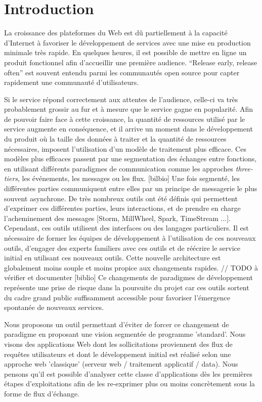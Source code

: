 \section{Introduction}

La croissance des plateformes du Web est dû partiellement à la capacité
d'Internet à favoriser le développement de services avec une mise en production minimale très rapide.
En quelques heures, il est possible de mettre en ligne un produit fonctionnel afin d'accueillir une première audience.
``Release early, release often'' est souvent entendu parmi les communautés open source pour capter rapidement une communauté d'utilisateurs.

Si le service répond correctement aux attentes de l'audience, celle-ci va très probablement grossir au fur et à mesure que le service gagne en popularité.
Afin de pouvoir faire face à cette croissance, la quantité de ressources utilisé par le service augmente en conséquence, et il arrive un moment dans le développement du produit où la taille des données à traiter et la quantité de ressources nécessaires, imposent l'utilisation d'un modèle de traitement plus efficace.
Ces modèles plus efficaces passent par une segmentation des échanges entre
fonctions, en utilisant différents paradigmes de communication comme les
approches \textit{three-tiers}, les événements, les messages ou les flux. [bilbio]
Une fois segmenté, les différentes parties communiquent entre elles par un principe de messagerie le plus souvent asynchrone.
De très nombreux outils ont été définis qui permettent d'exprimer ces différentes parties, leurs interactions, et de prendre en charge l'acheminement des messages [Storm, MillWheel, Spark, TimeStream ...].
Cependant, ces outils utilisent des interfaces ou des langages particuliers. Il est nécessaire de former les équipes de développement à l'utilisation de ces nouveaux outils, d'engager des experts familiers avec ces outils et de réécrire le service initial en utilisant ces nouveaux outils.
Cette nouvelle architecture est globalement moins souple et moins propice aux changements rapides. // TODO à vérifier et documenter [biblio]
Ce changements de paradigmes de développement représente une prise de risque dans la poursuite du projet car ces outils sortent du cadre grand public suffisamment accessible pour favoriser l'émergence spontanée de nouveaux services.

Nous proposons un outil permettant d'éviter de forcer ce changement de paradigme en proposant une vision segmentée de programme 'standard'.
Nous visons des applications Web dont les sollicitations proviennent des flux de requêtes utilisateurs et dont le développement initial est réalisé selon une approche web 'classique' (serveur web / traitement applicatif / data).
Nous pensons qu'il est possible d'analyser cette classe d'applications dès les premières étapes d'exploitations afin de les re-exprimer plus ou moins concrètement sous la forme de flux d'échange.


